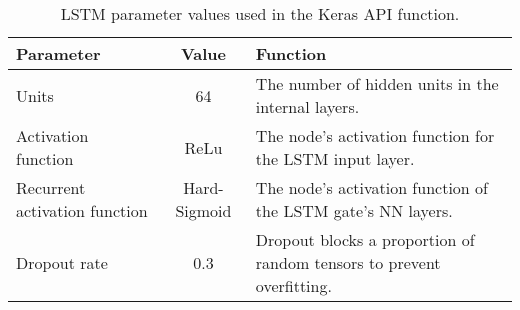 
\begin{table}[ht!]
    \centering
    \caption{\ac{LSTM} parameter values used in the Keras API function.}
    \begin{tabular}{>{\raggedright}p{} | c | p{}}
        Parameter                       & Value         & Function \\ \hline
        Units                           & 64            & The number of hidden units in the internal layers. \\ \hline
        Activation function             & ReLu          & The node's activation function for the \ac{LSTM} input layer.\\ \hline
        Recurrent activation function   & Hard-Sigmoid  & The node's activation function of the \ac{LSTM} gate's \ac{NN} layers.\\ \hline
        Dropout rate                    & 0.3           & Dropout blocks a proportion of random tensors to prevent overfitting.\\
        
    \end{tabular}
    \label{tab:lstm-parameters}
\end{table}